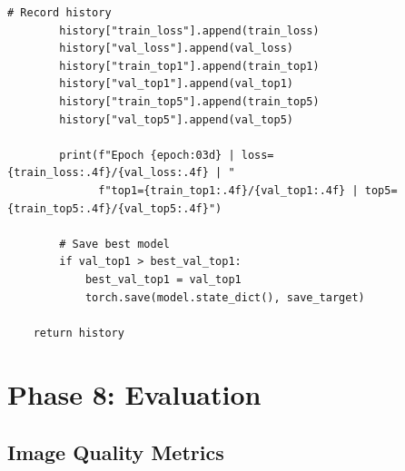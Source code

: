 \documentclass[11pt,a4paper]{article}
\begin{document}
\begin{lstlisting}[caption={src/train\_classifier.py - Main Training Function}, label={lst:train-classifier}]
        # Record history
        history["train_loss"].append(train_loss)
        history["val_loss"].append(val_loss)
        history["train_top1"].append(train_top1)
        history["val_top1"].append(val_top1)
        history["train_top5"].append(train_top5)
        history["val_top5"].append(val_top5)

        print(f"Epoch {epoch:03d} | loss={train_loss:.4f}/{val_loss:.4f} | "
              f"top1={train_top1:.4f}/{val_top1:.4f} | top5={train_top5:.4f}/{val_top5:.4f}")

        # Save best model
        if val_top1 > best_val_top1:
            best_val_top1 = val_top1
            torch.save(model.state_dict(), save_target)

    return history
\end{lstlisting}

\newpage
\section{Phase 8: Evaluation}
\label{sec:phase8}

\subsection{Image Quality Metrics}
\end{document}
